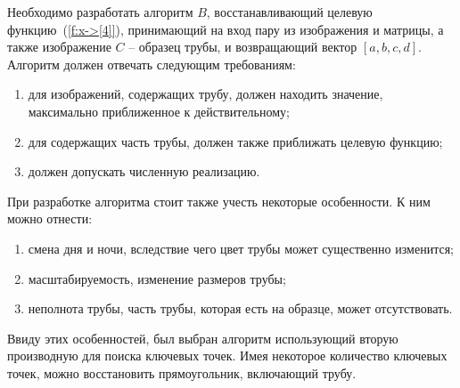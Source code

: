 \documentclass[14pt, a4paper]{extreport}
\begin{document}
	Необходимо разработать алгоритм $B$, восстанавливающий целевую функцию~(\ref{f:x->[4]}), принимающий на вход пару из изображения и матрицы, а также изображение $C$ -- образец трубы, и возвращающий вектор $[a, b, c, d]$. Алгоритм должен отвечать следующим требованиям:
	\begin{enumerate}[label={\arabic*)}]
		\item для изображений, содержащих трубу, должен находить значение, максимально приближенное к действительному;
		\item для содержащих часть трубы, должен также приближать целевую функцию;
		\item должен допускать численную реализацию.
	\end{enumerate}
	
	При разработке алгоритма стоит также учесть некоторые особенности. К ним можно отнести:
	\begin{enumerate}[label={\arabic*)}]
		\item смена дня и ночи, вследствие чего цвет трубы может существенно изменится;
		\item масштабируемость, изменение размеров трубы;
		\item неполнота трубы, часть трубы, которая есть на образце, может отсутствовать.
	\end{enumerate}
	
	Ввиду этих особенностей, был выбран алгоритм использующий вторую производную для поиска ключевых точек. Имея некоторое количество ключевых точек, можно восстановить прямоугольник, включающий трубу.
	
\end{document}
